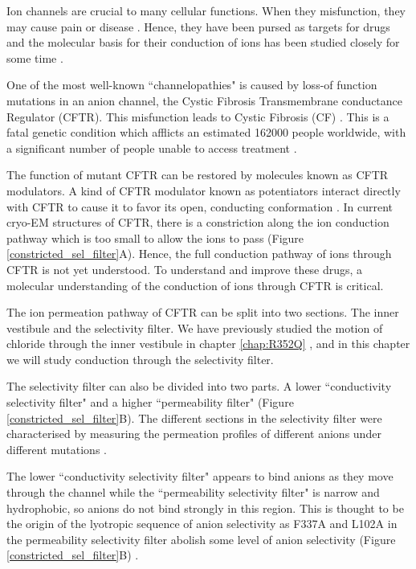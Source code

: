 Ion channels are crucial to many cellular functions. When they misfunction, they may cause pain or disease \cite{kingwell2019, kim2014}. Hence, they have been pursed as targets for drugs and the molecular basis for their conduction of ions has been studied closely for some time \cite{santos2017, doyle1998, roux1993}.

One of the most well-known ``channelopathies" is caused by loss-of function mutations in an anion channel, the Cystic Fibrosis Transmembrane conductance Regulator (CFTR). This misfunction leads to Cystic Fibrosis (CF) \cite{riordan1989,gadsby2006}. This is a fatal genetic condition which afflicts an estimated 162000 people worldwide, with a significant number of people unable to access treatment \cite{guo2022}.

The function of mutant CFTR can be restored by molecules known as CFTR modulators. A kind of CFTR modulator known as potentiators interact directly with CFTR to cause it to favor its open, conducting conformation \cite{liu2019}. In current cryo-EM structures of CFTR, there is a constriction along the ion conduction pathway which is too small to allow the ions to pass \cite{zhang2018} (Figure \ref{constricted_sel_filter}A). Hence, the full conduction pathway of ions through CFTR is not yet understood. To understand and improve these drugs, a molecular understanding of the conduction of ions through CFTR is critical. 

The ion permeation pathway of CFTR can be split into two sections. The inner vestibule and the selectivity filter. We have previously studied the motion of chloride through the inner vestibule in chapter \ref{chap:R352Q} \cite{wong2022a}, and in this chapter we will study conduction through the selectivity filter.

The selectivity filter can also be divided into two parts. A lower ``conductivity selectivity filter" and a higher ``permeability filter" (Figure \ref{constricted_sel_filter}B). The different sections in the selectivity filter were characterised by measuring the permeation profiles of different anions under different mutations \cite{linsdell2016}. 

The lower ``conductivity selectivity filter" appears to bind anions as they move through the channel while the ``permeability selectivity filter" is narrow and hydrophobic, so anions do not bind strongly in this region. This is thought to be the origin of the lyotropic sequence of anion selectivity as F337A and L102A in the permeability selectivity filter abolish some level of anion selectivity (Figure \ref{constricted_sel_filter}B) \cite{linsdell2021}. 

